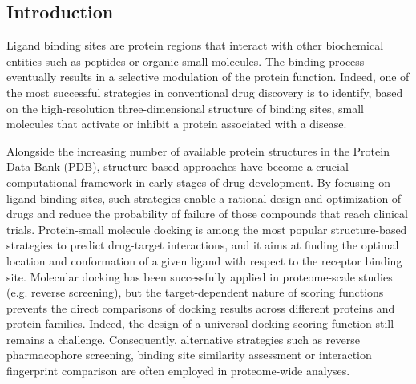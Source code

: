 \subsection{Introduction}

Ligand binding sites are protein regions that interact with other biochemical entities such as peptides or organic small molecules. The binding process eventually results in a selective modulation of the protein function. Indeed, one of the most successful strategies in conventional drug discovery is to identify, based on the high-resolution three-dimensional structure of binding sites, small molecules that activate or inhibit a protein associated with a disease\cite{sadybekov_computational_2023}.

Alongside the increasing number of available protein structures in the Protein Data Bank (PDB)\cite{goodsell_rcsb_2020}, structure-based approaches have become a crucial computational framework in early stages of drug development\cite{batool_structure-based_2019, sledz_protein_2018}. By focusing on ligand binding sites, such strategies enable a rational design and optimization of drugs and reduce the probability of failure of those compounds that reach clinical trials\cite{macalino_role_2015}. Protein-small molecule docking is among the most popular structure-based strategies to predict drug-target interactions, and it aims at finding the optimal location and conformation of a given ligand with respect to the receptor binding site\cite{kitchen_docking_2004}. Molecular docking has been successfully applied in proteome-scale studies (e.g. reverse screening\cite{westermaier_virtual_2015, lee_using_2016, pinzi_molecular_2019}), but the target-dependent nature of scoring functions prevents the direct comparisons of docking results across different proteins and protein families. Indeed, the design of a universal docking scoring function still remains a challenge\cite{li_overview_2019, shen_machine_2020}. Consequently, alternative strategies such as reverse pharmacophore screening, binding site similarity assessment or interaction fingerprint comparison are often employed in proteome-wide analyses\cite{sydow_advances_2019}.

